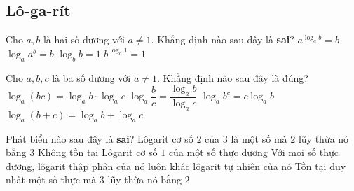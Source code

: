 \subsection{Lô-ga-rít}
\begin{ex}%
	Cho $a,b$ là hai số dương với $a\neq 1$. Khẳng định nào sau đây là \textbf{sai}?
	\choice
	{$a^{\log_a{b}}=b$}
	{$\log_a{a^b}=b$}
	{\True $\log_b{b}=1$}
	{$b^{\log_a{1}}=1$}
\end{ex}
\begin{ex}%
	Cho $a,b,c$ là ba số dương với $a\neq 1$. Khẳng định nào sau đây là đúng?
	\choice
	{$\log_a{(bc)}=\log_a{b}\cdot \log_a{c}$}
	{$\log_a{\dfrac{b}{c}}=\dfrac{\log_a{b}}{\log_a{c}}$}
	{\True $\log_a{b^c}=c\log_a{b}$}
	{$\log_a{(b+c)}=\log_a{b}+\log_a{c}$}
\end{ex}
\begin{ex}%
	Phát biểu nào sau đây là \textbf{sai}?
	\choice
	{Lôgarit cơ số $2$ của $3$ là một số mà $2$ lũy thừa nó bằng $3$}
	{Không tồn tại Lôgarit cơ số $1$ của một số thực dương}
	{\True Với mọi số thực dương, lôgarit thập phân của nó luôn khác lôgarit tự nhiên của nó}
	{Tồn tại duy nhất một số thực mà $3$ lũy thừa nó bằng $2$}
\end{ex}
